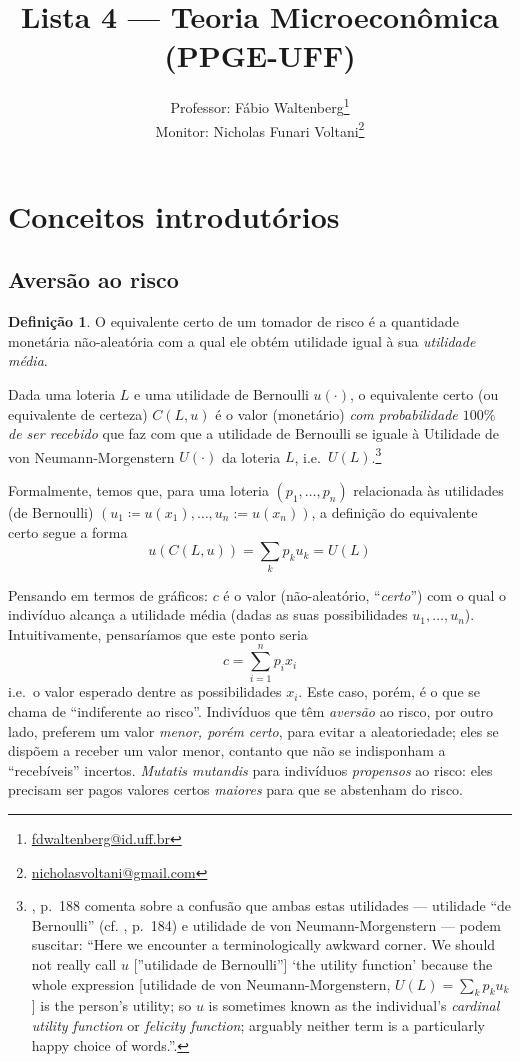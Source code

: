 \documentclass[12pt]{article}
\title{Lista 4 --- Teoria Microeconômica (PPGE-UFF)}
\author{Professor: Fábio Waltenberg\thanks{\href{mailto:fdwaltenberg@id.uff.br}{fdwaltenberg@id.uff.br}} \\Monitor: Nicholas Funari Voltani\thanks{\href{mailto:nicholasvoltani@gmail.com}{nicholasvoltani@gmail.com}}}
\date{}
\numberwithin{equation}{section}
\theoremstyle{plain}
\theoremstyle{definition}
\newtheorem{definition}[theorem]{Definição}
\theoremstyle{remark}
\begin{document}
\maketitle

\hypertarget{conceitos-introdutuxf3rios}{%
\section{Conceitos introdutórios}\label{conceitos-introdutuxf3rios}}

\hypertarget{aversuxe3o-ao-risco}{%
\subsection{Aversão ao risco}\label{aversuxe3o-ao-risco}}

\begin{definition}
O equivalente certo de um tomador de risco é a quantidade monetária
não-aleatória com a qual ele obtém utilidade igual à sua
\textit{utilidade média}.

Dada uma loteria \(L\) e uma utilidade de Bernoulli \(u(\cdot)\), o
equivalente certo (ou equivalente de certeza) \(C(L, u)\) é o valor
(monetário) \textit{com probabilidade \(100\%\) de ser recebido} que faz
com que a utilidade de Bernoulli se iguale à Utilidade de von
Neumann-Morgenstern \(U(\cdot)\) da loteria \(L\),
i.e.~\(U(L)\).\footnote{\textcite{Cowell2004}, p.~188 comenta sobre a
  confusão que ambas estas utilidades --- utilidade ``de Bernoulli''
  (cf. \textcite{Mas-Colell1995}, p.~184) e utilidade de von
  Neumann-Morgenstern --- podem suscitar: ``Here we encounter a
  terminologically awkward corner. We should not really call \(u\)
  {[}''utilidade de Bernoulli''{]} `the utility function' because the
  whole expression {[}utilidade de von Neumann-Morgenstern,
  \(U(L) = \sum \limits_{k} p_{k} u_{k}\){]} is the person's utility; so
  \(u\) is sometimes known as the individual's \textit{cardinal utility
  function} or \textit{felicity function}; arguably neither term is a
  particularly happy choice of words.''.}

Formalmente, temos que, para uma loteria \((p_{1}, \dots, p_{n})\)
relacionada às utilidades (de Bernoulli)
\((u_{1} \coloneqq u(x_{1}), \dots, u_{n}:= u(x_{n}))\), a definição do
equivalente certo segue a forma
\[
u(C(L, u)) = \sum \limits_{k} p_{k} u_{k} = U(L)
\]

Pensando em termos de gráficos: \(c\) é o valor (não-aleatório,
``\textit{certo}'') com o qual o indivíduo alcança a utilidade média
(dadas as suas possibilidades \(u_{1},\dots, u_{n}\)). Intuitivamente,
pensaríamos que este ponto seria
\[
c = \sum \limits_{i=1}^{n} p_{i} x_{i}
\]
i.e.~o valor esperado dentre as possibilidades \(x_{i}\). Este caso,
porém, é o que se chama de ``indiferente ao risco''. Indivíduos que têm
\textit{aversão} ao risco, por outro lado, preferem um valor
\textit{menor, porém certo}, para evitar a aleatoriedade; eles se
dispõem a receber um valor menor, contanto que não se indisponham a
``recebíveis'' incertos. \textit{Mutatis mutandis} para indivíduos
\textit{propensos} ao risco: eles precisam ser pagos valores certos
\textit{maiores} para que se abstenham do risco.


\end{definition}
\end{document}

